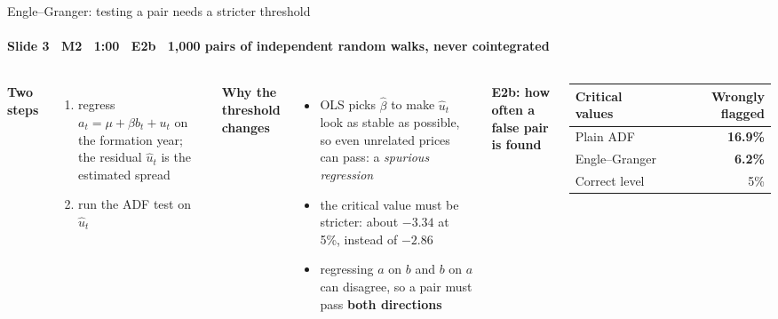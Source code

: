 \begin{frame}{Engle--Granger: testing a pair needs a stricter threshold}
\framesubtitle{Slide 3 \textbullet\ M2 \textbullet\ 1:00 \textbullet\ E2b \textbullet\ 1{,}000 pairs of independent random walks, never cointegrated}
\vspace{-2pt}
\begin{columns}[T,onlytextwidth]
  \footnotesize\raggedright
  \textbf{\color{deckAccent}Two steps}
  \begin{enumerate}\setlength{\itemsep}{1pt}
    \item regress $a_t=\mu+\beta b_t+u_t$ on the formation year; the residual $\hat u_t$ is the estimated spread
    \item run the ADF test on $\hat u_t$
  \end{enumerate}
  \vspace{2pt}
  \textbf{\color{deckAccent}Why the threshold changes}
  \begin{itemize}\setlength{\itemsep}{1pt}
    \item OLS picks $\hat\beta$ to make $\hat u_t$ look as stable as possible, so even unrelated prices can pass: a \emph{spurious regression}
    \item the critical value must be stricter: about $-3.34$ at 5\%, instead of $-2.86$
    \item regressing $a$ on $b$ and $b$ on $a$ can disagree, so a pair must pass \textbf{both directions}
  \end{itemize}
  \footnotesize
  \textbf{\color{deckAccent}E2b: how often a false pair is found}\\[3pt]
  \scriptsize\setlength{\tabcolsep}{5pt}
  \begin{tabular}{@{}lr@{}}
    \toprule
    Critical values & Wrongly flagged \\
    \midrule
    Plain ADF          & \textbf{16.9\%} \\
    Engle--Granger     & \textbf{6.2\%} \\
    \midrule
    Correct level      & 5\% \\
    \bottomrule
  \end{tabular}
\end{columns}
\end{frame}
